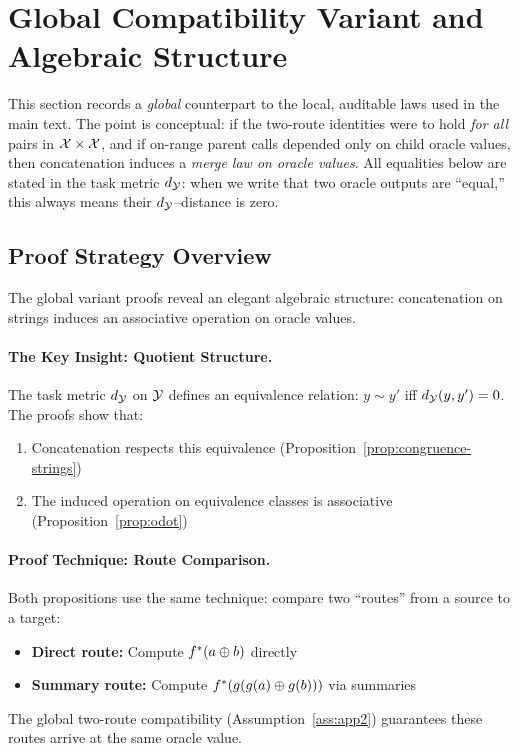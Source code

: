 \section{Global Compatibility Variant and Algebraic Structure}\label{sec:global}

This section records a \emph{global} counterpart to the local, auditable laws used in the main text. The point is conceptual: if the two-route identities were to hold \emph{for all} pairs in $\mathcal{X}\times\mathcal{X}$, and if on-range parent calls depended only on child oracle values, then concatenation induces a \emph{merge law on oracle values}. All equalities below are stated in the task metric $d_{\mathcal{Y}}$: when we write that two oracle outputs are ``equal,'' this always means their $d_{\mathcal{Y}}$–distance is zero.

\subsection{Proof Strategy Overview}

The global variant proofs reveal an elegant algebraic structure: concatenation on strings induces an associative operation on oracle values.

\paragraph{The Key Insight: Quotient Structure.}
The task metric $d_{\mathcal{Y}}$ on $\mathcal{Y}$ defines an equivalence relation: $y \sim y'$ iff $d_{\mathcal{Y}}(y, y') = 0$. The proofs show that:
\begin{enumerate}
    \item Concatenation respects this equivalence (Proposition~\ref{prop:congruence-strings})
    \item The induced operation on equivalence classes is associative (Proposition~\ref{prop:odot})
\end{enumerate}

\paragraph{Proof Technique: Route Comparison.}
Both propositions use the same technique: compare two ``routes'' from a source to a target:
\begin{itemize}
    \item \textbf{Direct route:} Compute $f^{\ast}(a \oplus b)$ directly
    \item \textbf{Summary route:} Compute $f^{\ast}(g(g(a) \oplus g(b)))$ via summaries
\end{itemize}
The global two-route compatibility (Assumption~\ref{ass:app2}) guarantees these routes arrive at the same oracle value.

